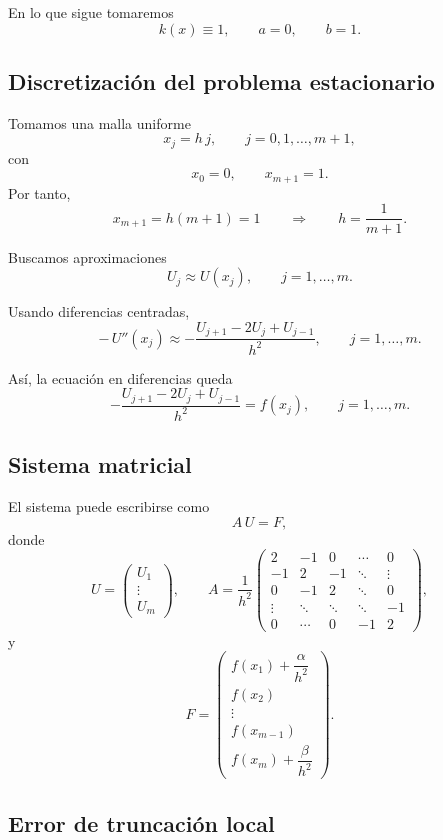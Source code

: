 En lo que sigue tomaremos
\[
k(x)\equiv 1,
\qquad
a=0,
\qquad
b=1.
\]

\subsection{Discretización del problema estacionario}

Tomamos una malla uniforme
\[
x_j=h\,j,
\qquad
j=0,1,\dots,m+1,
\]
con
\[
x_0=0,
\qquad
x_{m+1}=1.
\]
Por tanto,
\[
x_{m+1}=h(m+1)=1
\qquad \Longrightarrow \qquad
h=\frac{1}{m+1}.
\]

Buscamos aproximaciones
\[
U_j\approx U(x_j),
\qquad j=1,\dots,m.
\]

Usando diferencias centradas,
\[
-\,U''(x_j)
\approx
-\frac{U_{j+1}-2U_j+U_{j-1}}{h^2},
\qquad j=1,\dots,m.
\]

Así, la ecuación en diferencias queda
\[
-\frac{U_{j+1}-2U_j+U_{j-1}}{h^2}=f(x_j),
\qquad j=1,\dots,m.
\]

\subsection{Sistema matricial}

El sistema puede escribirse como
\[
A\,U=F,
\]
donde
\[
U=
\begin{pmatrix}
U_1\\
\vdots\\
U_m
\end{pmatrix},
\qquad
A=
\frac{1}{h^2}
\begin{pmatrix}
2 & -1 & 0 & \cdots & 0\\
-1 & 2 & -1 & \ddots & \vdots\\
0 & -1 & 2 & \ddots & 0\\
\vdots & \ddots & \ddots & \ddots & -1\\
0 & \cdots & 0 & -1 & 2
\end{pmatrix},
\]
y
\[
F=
\begin{pmatrix}
f(x_1)+\dfrac{\alpha}{h^2}\\[6pt]
f(x_2)\\
\vdots\\
f(x_{m-1})\\[2pt]
f(x_m)+\dfrac{\beta}{h^2}
\end{pmatrix}.
\]

\subsection{Error de truncación local}

